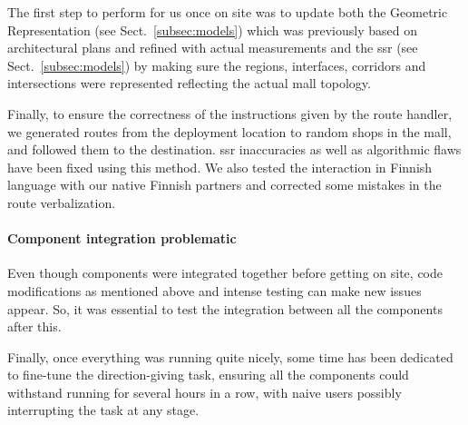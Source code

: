 \documentclass[a4paper,11pt,twoside]{StyleThese}
\begin{document}
The first step to perform for us once on site was to update both the Geometric Representation (see Sect.~\ref{subsec:models}) which was previously based on architectural plans and refined with actual measurements and the \acrlong{ssr} (see Sect.~\ref{subsec:models}) by making sure the regions, interfaces, corridors and intersections were represented reflecting the actual mall topology. 

Finally, to ensure the correctness of the instructions given by the route handler, we generated routes from the deployment location to random shops in the mall, and followed them to the destination. \acrshort{ssr} inaccuracies as well as algorithmic flaws have been fixed using this method. We also tested the interaction in Finnish language with our native Finnish partners and corrected some mistakes in the route verbalization.


\paragraph{Component integration problematic}
Even though components were integrated together before getting on site, code modifications as mentioned above and intense testing can make new issues appear. So, it was essential to test the integration between all the components after this.

Finally, once everything was running quite nicely, some time has been dedicated to fine-tune the direction-giving task, ensuring all the components could withstand running for several hours in a row, with naive users possibly interrupting the task at any stage. 
\end{document}
